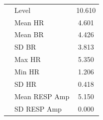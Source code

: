 \documentclass[11pt, a4paper]{article}
\begin{document}
\begin{table}[htbp]
\begin{tabular}{llc}
										&Level      &  10.610 \\
										&Mean HR             &  4.601\\
										&Mean BR             &  4.426 \\
										&SD BR              &  3.813 \\
										&Max HR             &  5.350 \\
										&Min HR              &  1.206 \\
										&SD HR             &  0.418 \\
										&Mean RESP Amp       &  5.150 \\
										&SD RESP Amp		&  0.000 \\				
		\bottomrule
	\end{tabular}
\end{table}
\end{document}
